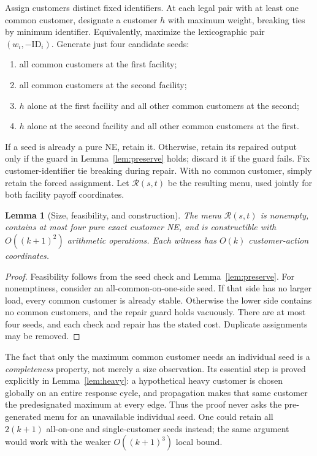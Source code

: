 \documentclass[11pt]{article}
\newtheorem{lemma}[theorem]{Lemma}
\theoremstyle{definition}
\theoremstyle{remark}
\newcommand{\Rmenu}{\mathcal R}
\begin{document}
Assign customers distinct fixed identifiers. At each legal pair with at least one common customer, designate a customer $h$ with maximum weight, breaking ties by minimum identifier. Equivalently, maximize the lexicographic pair $(w_i,-\mathrm{ID}_i)$. Generate just four candidate seeds:
\begin{enumerate}
\item all common customers at the first facility;
\item all common customers at the second facility;
\item $h$ alone at the first facility and all other common customers at the second;
\item $h$ alone at the second facility and all other common customers at the first.
\end{enumerate}
If a seed is already a pure NE, retain it. Otherwise, retain its repaired output only if the guard in Lemma~\ref{lem:preserve} holds; discard it if the guard fails. Fix customer-identifier tie breaking during repair. With no common customer, simply retain the forced assignment. Let $\Rmenu(s,t)$ be the resulting menu, used jointly for both facility payoff coordinates.

\begin{lemma}[Size, feasibility, and construction]\label{lem:four-seed}
The menu $\Rmenu(s,t)$ is nonempty, contains at most four pure exact customer NE, and is constructible with $O((k+1)^2)$ arithmetic operations. Each witness has $O(k)$ customer-action coordinates.
\end{lemma}
\begin{proof}
Feasibility follows from the seed check and Lemma~\ref{lem:preserve}. For nonemptiness, consider an all-common-on-one-side seed. If that side has no larger load, every common customer is already stable. Otherwise the lower side contains no common customers, and the repair guard holds vacuously. There are at most four seeds, and each check and repair has the stated cost. Duplicate assignments may be removed.
\end{proof}

The fact that only the maximum common customer needs an individual seed is a \emph{completeness} property, not merely a size observation. Its essential step is proved explicitly in Lemma~\ref{lem:heavy}: a hypothetical heavy customer is chosen globally on an entire response cycle, and propagation makes that same customer the predesignated maximum at every edge. Thus the proof never asks the pre-generated menu for an unavailable individual seed. One could retain all $2(k+1)$ all-on-one and single-customer seeds instead; the same argument would work with the weaker $O((k+1)^3)$ local bound.
\end{document}
